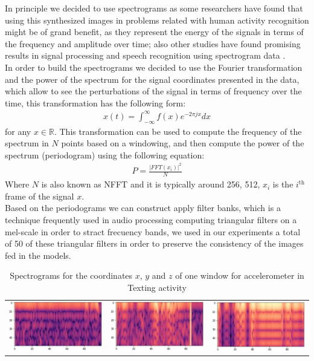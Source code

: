 \documentclass[10pt,halfline,a4paper]{ouparticle}
\begin{document}
\noindent
In principle we decided to use spectrograms as some researchers have found that using this synthesized images in problems related with human activity recognition might be of grand benefit, as they represent the energy of the signals in terms of the frequency and amplitude over time; also other studies have found promising results in signal processing and speech recognition using spectrogram data \cite{Parreno} \cite{Ravi} \cite{Ordonez}. \\

\noindent 
In order to build the spectrograms we decided to use the Fourier transformation and the power of the spectrum for the signal coordinates presented in the data, which allow to see the perturbations of the signal in terms of frequency over the time, this transformation has the following form:
\begin{align}
x(t) = \int_{-\infty}^{\infty}{f(x)e^{-2\pi jx} dx}
\end{align} 
for any $x\in \mathbb{R}$. This transformation can be used to compute the frequency of the spectrum in  $N$ points based on a windowing, and then compute the power of the spectrum (periodogram) using the following equation:
\begin{align*}
P = \frac{|FFT(x_i)|^2}{N}
\end{align*}
Where $N$ is also known as NFFT and it is typically around 256, 512, $x_i$ is the $i^{\text{th}}$ frame of the signal $x$. \cite{speech}\\

\noindent
Based on the periodograms we can construct apply filter banks, which is a technique frequently used in audio processing computing triangular filters on a mel-scale in order to stract frecuency bands, we used in our experiments a total of 50 of these triangular filters in order to preserve the consistency of the images fed in the models.

\begin{table}[H]
	\centering
	\begin{tabular}{lll}
		\includegraphics[width=0.3\linewidth]{x} &
		\includegraphics[width=0.3\linewidth]{y} &
		\includegraphics[width=0.3\linewidth]{z}
	\end{tabular}
	\caption{Spectrograms for the coordinates $x$, $y$ and $z$ of one window for accelerometer in Texting activity }
	\label{tab:coordinates}
\end{table}
\end{document}
